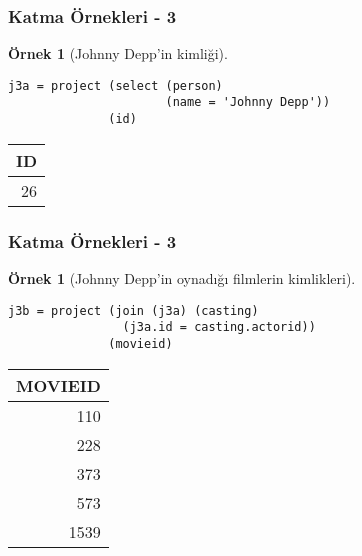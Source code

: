 \documentclass[dvipsnames]{beamer}
\theoremstyle{definition}
\theoremstyle{example}
\newtheorem{ornek}[theorem]{Örnek}
\theoremstyle{plain}
\begin{document}
\begin{frame}[fragile]
  \frametitle{Katma Örnekleri - 3}

  \begin{ornek}[Johnny Depp'in kimliği]
    \begin{lstlisting}
j3a = project (select (person)
                      (name = 'Johnny Depp'))
              (id)
    \end{lstlisting}

    \pause
    \begin{tiny}
    \begin{table}
      \begin{tabular}{|r|}\hline
ID\\\hline\hline
26\\\hline
      \end{tabular}
    \end{table}
    \end{tiny}
  \end{ornek}
\end{frame}

\begin{frame}[fragile]
  \frametitle{Katma Örnekleri - 3}

  \begin{ornek}[Johnny Depp'in oynadığı filmlerin kimlikleri]
    \begin{lstlisting}
j3b = project (join (j3a) (casting)
                (j3a.id = casting.actorid))
              (movieid)
    \end{lstlisting}

    \pause
    \begin{tiny}
    \begin{table}
      \begin{tabular}{|r|}\hline
MOVIEID\\\hline\hline
    110\\\hline
    228\\\hline
    373\\\hline
    573\\\hline
   1539\\\hline
      \end{tabular}
    \end{table}
    \end{tiny}
  \end{ornek}
\end{frame}
\end{document}
